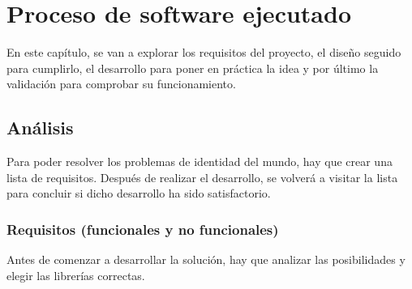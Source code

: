 \chapter{Proceso de software ejecutado}\label{Proceso de software ejecutado}

\thispagestyle{fancy}


En este capítulo, se van a explorar los requisitos del proyecto, el diseño seguido para cumplirlo, el desarrollo para poner en práctica la idea y por último la validación para comprobar su funcionamiento.

\section{Análisis}
Para poder resolver los problemas de identidad del mundo, hay que crear una lista de requisitos. Después de realizar el desarrollo, se volverá a visitar la lista para concluir si dicho desarrollo ha sido satisfactorio.

\subsection{Requisitos (funcionales y no funcionales)}
Antes de comenzar a desarrollar la solución, hay que analizar las posibilidades y elegir las librerías correctas.

